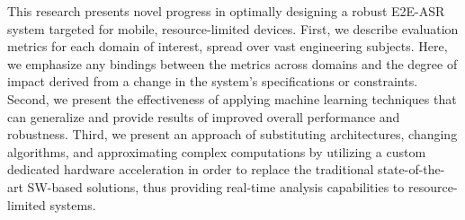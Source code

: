 This research presents novel progress in optimally designing 
a robust E2E-ASR system
targeted for mobile, 
resource-limited devices. 
First, we describe evaluation metrics for each domain of interest, 
spread over vast engineering subjects. 
Here, we emphasize any bindings between the metrics 
across domains and the degree of impact 
derived from a change in the system's specifications or constraints. 
Second, we present the effectiveness
of applying machine learning techniques 
that can generalize and provide results 
of improved overall performance and robustness.
Third, we present an approach of substituting
architectures, changing algorithms,
and approximating complex computations
by utilizing 
a custom dedicated hardware acceleration 
in order to replace the 
traditional state-of-the-art SW-based 
solutions, thus providing real-time 
analysis capabilities to resource-limited systems.


